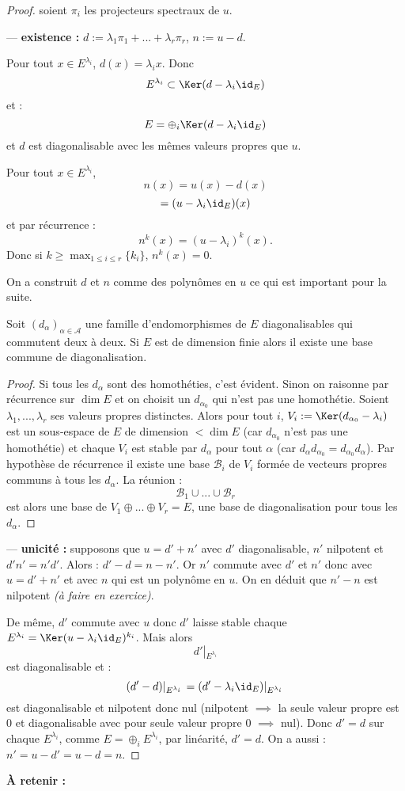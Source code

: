 \documentclass[class=report,crop=false]{standalone}
\newcommand{\exoo}{\emph{(à faire en exercice)}}
\newcommand{\Res}[1]{{\left | {}_{#1} \right.}}
\begin{document}
\begin{proof}

soient $\pi_i$ les projecteurs spectraux de $u$.

--- {\bf existence :} $d:= \lambda_1 \pi_1 + ... + \lambda_r \pi_r$, $n:= u - d$.

Pour tout $x \in E^{\lambda_i}$, $d(x) =\lambda_i x$. Donc 
\[E^{\lambda_i} \subset \Ker (d-\lambda_i\id_E) \]
et : \[E = \oplus_i \Ker(d-\lambda_i\id_E)\]
et $d$ est diagonalisable avec les mêmes valeurs propres que $u$.

Pour tout $x \in E^{\lambda_i}$, \[n(x) = u(x) - d(x) \]\[= (u-\lambda_i\id_E)(x)\] et par récurrence :
\[n^k(x) = (u-\lambda_i)^k(x) .\]
Donc si $k \ge \max_{{ 1 \le i \le r}}{\{k_i\}}$, $n^k(x) = 0$.

On a construit $d$ et $n$ comme des polynômes en $u$ ce qui est important pour la suite.

\begin{lemme}
Soit $(d_\alpha)_{\alpha\in \mathcal{A}}$ une famille d'endomorphismes de $E$ diagonalisables qui commutent deux à deux. Si $E$ est de dimension finie alors il existe une base commune de diagonalisation.
\end{lemme}

\begin{proof}
Si tous les $d_\alpha$ sont des homothéties, c'est évident. Sinon on raisonne par récurrence sur $\dim E$ et on choisit un $d_{\alpha_0}$ qui n'est pas une homothétie. Soient $\lambda_1,...,\lambda_r$ ses valeurs propres distinctes. Alors pour tout $i$, $V_i:=\Ker (d_{\alpha_0}-\lambda_i)$ est un sous-espace de $E$ de dimension $< \dim E$ (car $d_{\alpha_0}$ n'est pas une homothétie) et chaque $V_i$ est stable par $d_\alpha$ pour tout $\alpha$ (car $d_\alpha d_{\alpha_0} = d_{\alpha_0}d_\alpha$). Par hypothèse de récurrence il existe une base $\mathcal{B}_i$ de $V_i$ formée de vecteurs propres communs à tous les $d_\alpha$. La réunion :
\[\mathcal{B}_1 \cup ... \cup \mathcal{B}_r\]
est alors une base de $V_1 \oplus...\oplus V_r =E$, une base de diagonalisation pour tous les $d_\alpha$.  
\end{proof}

--- {\bf unicité :} supposons que $u = d'+n'$ avec $d'$ diagonalisable, $n'$ nilpotent et $d'n'=n'd'$. Alors : $ d'-d =n-n'$. Or $n'$ commute avec $d'$ et $n'$ donc avec $u=d'+n'$ et avec $n$ qui est un polynôme en $u$. On en déduit que $n'-n$ est nilpotent \exoo.

De même, $d'$ commute avec $u$ donc $d'$ laisse stable chaque $E^{\lambda_i}=\Ker (u-\lambda_i\id_E)^{k_i}$. Mais alors \[d'\Res{E^{\lambda_i}}\]
est diagonalisable et :
\[(d'-d)\Res{E^{\lambda_i}} = (d'-\lambda_i\id_E)\Res{E^{\lambda_i}}\]
est diagonalisable et nilpotent donc nul (nilpotent $\implies$ la seule valeur propre est $0$ et diagonalisable avec pour seule valeur propre $0$ $\implies$ nul).
Donc $d'=d$ sur chaque $E^{\lambda_i}$, comme $E= \oplus_i E^{\lambda_i}$, par linéarité, $d'=d$. On a aussi : $n'=u-d'=u-d=n$.

\end{proof}
{\bf  \`A retenir :} 
\end{document}
